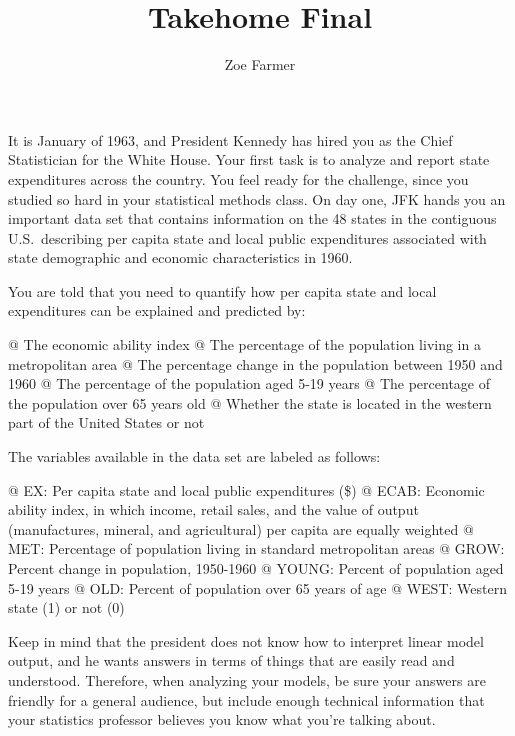 \documentclass[10pt]{article}\usepackage[]{graphicx}\usepackage[]{xcolor}
\title{Takehome Final}
\author{Zoe Farmer}
\begin{document}
\maketitle




It is January of 1963, and President Kennedy has hired you as the Chief Statistician for the White House.  Your first
task is to analyze and report state expenditures across the country. You feel ready for the challenge, since you studied
so hard in your statistical methods class. On day one, JFK hands you an important data set that contains information on
the 48 states in the contiguous U.S.\ describing per capita state and local public expenditures associated with state
demographic and economic characteristics in 1960.\newline

\noindent You are told that you need to quantify how per capita state and local expenditures can be explained and
predicted by:

\begin{easylist}[itemize]
    @ The economic ability index
    @ The percentage of the population living in a metropolitan area
    @ The percentage change in the population between 1950 and 1960
    @ The percentage of the population aged 5-19 years
    @ The percentage of the population over 65 years old
    @ Whether the state is located in the western part of the United States or not
\end{easylist}

\vspace{0.5cm}

\noindent The variables available in the data set are labeled as follows:

\begin{easylist}[enumerate]
    @ EX: Per capita state and local public expenditures (\$)
    @ ECAB: Economic ability index, in which income, retail sales, and the value of output (manufactures, mineral, and
    agricultural) per capita are equally weighted
    @ MET: Percentage of population living in standard metropolitan areas
    @ GROW: Percent change in population, 1950-1960
    @ YOUNG: Percent of population aged 5-19 years
    @ OLD: Percent of population over 65 years of age
    @ WEST: Western state (1) or not (0)
\end{easylist}

\vspace{0.5cm}

\noindent Keep in mind that the president does not know how to interpret linear model output, and he wants answers in
terms of things that are easily read and understood. Therefore, when analyzing your models, be sure your answers are
friendly for a general audience, but include enough technical information that your statistics professor believes you
know what you're talking about.
\end{document}
